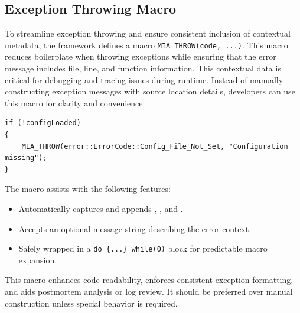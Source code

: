 \subsection{Exception Throwing Macro}
To streamline exception throwing and ensure consistent inclusion of contextual metadata, the framework defines a macro \texttt{MIA\_THROW(code, ...)}. This macro reduces boilerplate when throwing exceptions while ensuring that the error message includes file, line, and function information. This contextual data is critical for debugging and tracing issues during runtime. Instead of manually constructing exception messages with source location details, developers can use this macro for clarity and convenience:
\begin{lstlisting}[style=cppstyle]
if (!configLoaded)
{
    MIA_THROW(error::ErrorCode::Config_File_Not_Set, "Configuration missing");
}
\end{lstlisting}
The macro assists with the following features:
\begin{itemize}\itemsep0em
    \item Automatically captures and appends , , and .
    \item Accepts an optional message string describing the error context.
    \item Safely wrapped in a \texttt{do \{...\} while(0)} block for predictable macro expansion.
\end{itemize}
This macro enhances code readability, enforces consistent exception formatting, and aids postmortem analysis or log review. It should be preferred over manual  construction unless special behavior is required.



